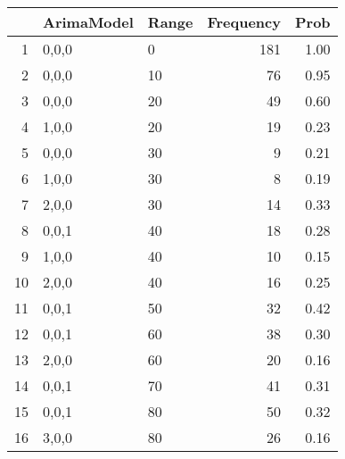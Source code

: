 \begin{table}[ht]
\centering
\begin{tabular}{rllrr}
  \hline
 & ArimaModel & Range & Frequency & Prob \\ 
  \hline
1 & 0,0,0 & 0 & 181 & 1.00 \\ 
  2 & 0,0,0 & 10 &  76 & 0.95 \\ 
  3 & 0,0,0 & 20 &  49 & 0.60 \\ 
  4 & 1,0,0 & 20 &  19 & 0.23 \\ 
  5 & 0,0,0 & 30 &   9 & 0.21 \\ 
  6 & 1,0,0 & 30 &   8 & 0.19 \\ 
  7 & 2,0,0 & 30 &  14 & 0.33 \\ 
  8 & 0,0,1 & 40 &  18 & 0.28 \\ 
  9 & 1,0,0 & 40 &  10 & 0.15 \\ 
  10 & 2,0,0 & 40 &  16 & 0.25 \\ 
  11 & 0,0,1 & 50 &  32 & 0.42 \\ 
  12 & 0,0,1 & 60 &  38 & 0.30 \\ 
  13 & 2,0,0 & 60 &  20 & 0.16 \\ 
  14 & 0,0,1 & 70 &  41 & 0.31 \\ 
  15 & 0,0,1 & 80 &  50 & 0.32 \\ 
  16 & 3,0,0 & 80 &  26 & 0.16 \\ 
   \hline
\end{tabular}
\end{table}
